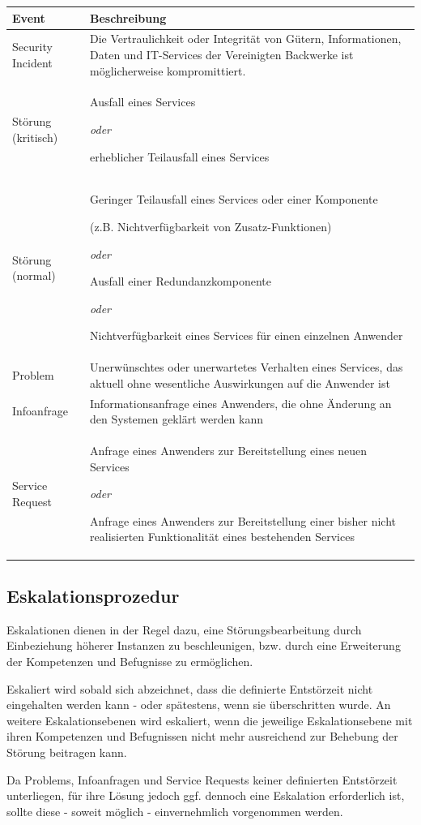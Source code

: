 \documentclass[]{article}
\begin{document}
\begin{longtable}{lp{6cm}}
\toprule
Event & Beschreibung\tabularnewline
\midrule
Security Incident & Die Vertraulichkeit oder Integrität von Gütern,
Informationen, Daten und IT-Services der Vereinigten Backwerke ist
möglicherweise kompromittiert.\tabularnewline
Störung (kritisch) & Ausfall eines Services

\emph{oder}

erheblicher Teilausfall eines Services\tabularnewline
Störung (normal) & Geringer Teilausfall eines Services oder einer
Komponente

(z.B. Nichtverfügbarkeit von Zusatz-Funktionen)

\emph{oder}

Ausfall einer Redundanzkomponente

\emph{oder}

Nichtverfügbarkeit eines Services für einen einzelnen
Anwender\tabularnewline
Problem & Unerwünschtes oder unerwartetes Verhalten eines Services, das
aktuell ohne wesentliche Auswirkungen auf die Anwender
ist\tabularnewline
Infoanfrage & Informationsanfrage eines Anwenders, die ohne Änderung an
den Systemen geklärt werden kann\tabularnewline
Service Request & Anfrage eines Anwenders zur Bereitstellung eines neuen
Services

\emph{oder}

Anfrage eines Anwenders zur Bereitstellung einer bisher nicht
realisierten Funktionalität eines bestehenden Services\tabularnewline
\bottomrule
\end{longtable}

\subsection{Eskalationsprozedur}\label{eskalationsprozedur}

Eskalationen dienen in der Regel dazu, eine Störungsbearbeitung durch
Einbeziehung höherer Instanzen zu beschleunigen, bzw. durch eine
Erweiterung der Kompetenzen und Befugnisse zu ermöglichen.

Eskaliert wird sobald sich abzeichnet, dass die definierte Entstörzeit
nicht eingehalten werden kann - oder spätestens, wenn sie überschritten
wurde. An weitere Eskalationsebenen wird eskaliert, wenn die jeweilige
Eskalationsebene mit ihren Kompetenzen und Befugnissen nicht mehr
ausreichend zur Behebung der Störung beitragen kann.

Da Problems, Infoanfragen und Service Requests keiner definierten
Entstörzeit unterliegen, für ihre Lösung jedoch ggf. dennoch eine
Eskalation erforderlich ist, sollte diese - soweit möglich -
einvernehmlich vorgenommen werden.
\end{document}
